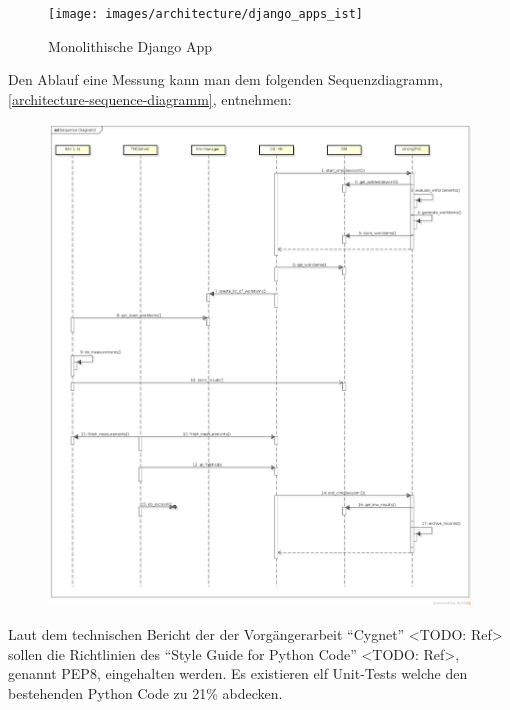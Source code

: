 \begin{figure}[H]
	\centering
	\texttt{[image: images/architecture/django\_apps\_ist]}
    \caption{Monolithische Django App}
    \label{django-ist-diagram}
\end{figure}

Den Ablauf eine Messung kann man dem folgenden Sequenzdiagramm,
\autoref{architecture-sequence-diagramm}, entnehmen:
\begin{figure}[H]
	\centering
	\includegraphics[width=\textwidth]{./images/architecture/architecture_sequence_diagramm-2014-03-12}
	\caption{}
	\label{architecture-sequence-diagramm}
\end{figure}

Laut dem technischen Bericht der der Vorgängerarbeit \enquote{Cygnet} <TODO:
Ref> sollen die Richtlinien des \enquote{Style Guide for Python Code} <TODO:
Ref>, genannt PEP8, eingehalten werden. Es existieren elf Unit-Tests welche den
bestehenden Python Code zu 21\% abdecken.\\


